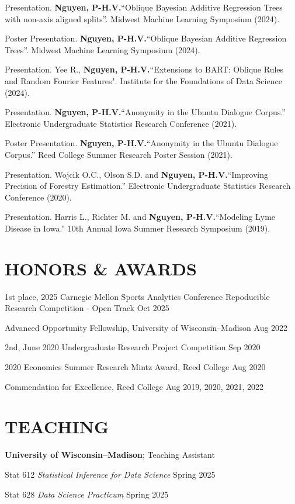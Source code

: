 \documentclass[margin]{res}
\def\pvn{\textbf{Nguyen, P-H.V.}}
\begin{document}
\begin{resume}
Presentation. \pvn ``Oblique Bayesian Additive Regression Trees with non-axis aligned splits''. Midwest Machine Learning Symposium (2024).

Poster Presentation. \pvn ``Oblique Bayesian Additive Regression Trees''. Midwest Machine Learning Symposium (2024).

Presentation. Yee R., \pvn  ``Extensions to BART: Oblique Rules and Random Fourier Features". Institute for the Foundations of Data Science (2024).

Presentation. \pvn ``Anonymity in the Ubuntu Dialogue Corpus.” Electronic Undergraduate Statistics Research Conference (2021).

Poster Presentation. \pvn ``Anonymity in the Ubuntu Dialogue Corpus.” Reed College Summer Research Poster Session (2021).

Presentation. Wojcik O.C., Olson S.D. and \pvn ``Improving Precision of Forestry Estimation.” Electronic Undergraduate Statistics Research Conference (2020).

Presentation. Harris L., Richter M. and \pvn ``Modeling Lyme Disease in Iowa.” 10th Annual Iowa Summer Research Symposium (2019).


\section{HONORS \& AWARDS} 

1st place, 2025 Carnegie Mellon Sports Analytics Conference Repoducible Research Competition - Open Track \hfill Oct 2025

Advanced Opportunity Fellowship, University of Wisconsin--Madison \hfill Aug 2022

2nd, June 2020 Undergraduate Research Project Competition \hfill Sep 2020

2020 Economics Summer Research Mintz Award, Reed College \hfill Aug 2020

Commendation for Excellence, Reed College \hfill Aug 2019, 2020, 2021, 2022

\section{TEACHING}

\textbf{University of Wisconsin--Madison}; Teaching Assistant

Stat 612 {\it Statistical Inference for Data Science}  \hfill Spring 2025

Stat 628 {\it Data Science Practicum} \hfill Spring 2025


\end{resume}
\end{document}
